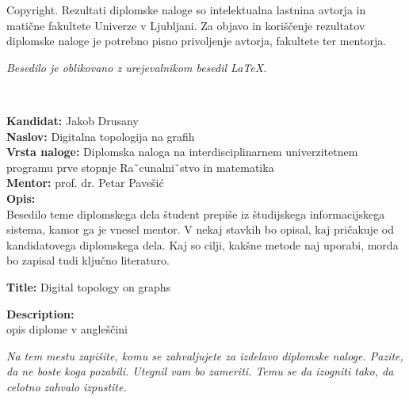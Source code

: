 \documentclass[a4paper, 12pt]{book}
\newcommand{\clearemptydoublepage}{\newpage{\pagestyle{empty}\cleardoublepage}}
\theoremstyle{definition}
\theoremstyle{remark}
\begin{document}
\thispagestyle{empty}
\vspace*{8cm}

\noindent
{\sc Copyright}. 
Rezultati diplomske naloge so intelektualna lastnina avtorja in matične fakultete Univerze v Ljubljani.
Za objavo in koriščenje rezultatov diplomske naloge je potrebno pisno privoljenje avtorja, fakultete ter mentorja.

\begin{center}
\mbox{}\vfill
\emph{Besedilo je oblikovano z urejevalnikom besedil \LaTeX.}
\end{center}
\clearemptydoublepage

\thispagestyle{empty}
\
\vfill

\bigskip
\noindent\textbf{Kandidat:} Jakob Drusany\\
\noindent\textbf{Naslov:} Digitalna topologija na grafih\\
\noindent\textbf{Vrsta naloge:} Diplomska naloga na interdisciplinarnem univerzitetnem programu prve stopnje Raˇcunalniˇstvo in matematika\\
\noindent\textbf{Mentor:} prof. dr. Petar Pavešić\\

\bigskip
\noindent\textbf{Opis:}\\
Besedilo teme diplomskega dela študent prepiše iz študijskega informacijskega sistema, kamor ga je vnesel mentor. 
V nekaj stavkih bo opisal, kaj pričakuje od kandidatovega diplomskega dela. 
Kaj so cilji, kakšne metode naj uporabi, morda bo zapisal tudi ključno literaturo.

\bigskip
\noindent\textbf{Title:} Digital topology on graphs

\bigskip
\noindent\textbf{Description:}\\
opis diplome v angleščini

\vfill



\vspace{2cm}

\clearemptydoublepage

\thispagestyle{empty}\mbox{}\vfill\null\it%
\noindent
Na tem mestu zapišite, komu se zahvaljujete za izdelavo diplomske naloge. Pazite, da ne boste koga pozabili. Utegnil vam bo zameriti. Temu se da izogniti tako, da celotno zahvalo izpustite.
\rm\normalfont
\end{document}

